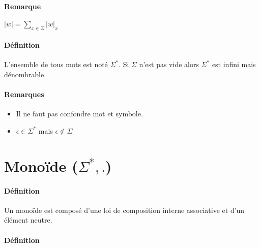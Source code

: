 

\paragraph{Remarque} %
\label{par:remarque}

$\left|w\right|=\sum\limits_{x\in\Sigma} \left|w\right|_x$



\paragraph{Définition} %
\label{par:d_finition}

L'ensemble de tous mots est noté $\Sigma^*$. Si $\Sigma$ n'est pas vide alors $\Sigma^*$ est infini mais dénombrable.



\paragraph{Remarques} %
\label{par:remarques}

\begin{itemize}
	\item Il ne faut pas confondre mot et symbole.
	\item $\epsilon \in \Sigma^*$ mais $\epsilon \not \in \Sigma$
\end{itemize}





\section{Monoïde ($\Sigma^*,.$)} %
\label{sec:mono_de_}

\paragraph{Définition} %
\label{par:d_finition}

Un monoïde est composé d'une loi de composition interne associative et d'un élément neutre.



\paragraph{Définition} %
\label{par:d_finition}

